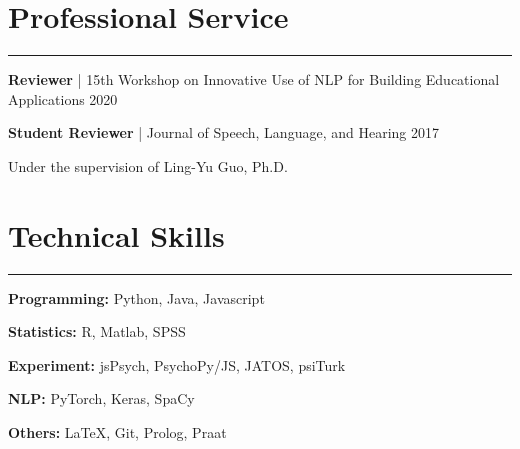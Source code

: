 \documentclass[11pt]{article}
\newcommand{\resumesection}[1]{\vspace{-0.2cm}\section*{#1}\vspace{-0.2cm}\hrule\vspace{0.2cm}}
\begin{document}
\resumesection{Professional Service}

\textbf{Reviewer} | 15th Workshop on Innovative Use of NLP for Building Educational Applications \hfill 2020

\textbf{Student Reviewer} | Journal of Speech, Language, and Hearing \hfill 2017

\quad Under the supervision of Ling-Yu Guo, Ph.D.

\resumesection{Technical Skills}

\textbf{Programming:} Python, Java, Javascript

\textbf{Statistics:} R, Matlab, SPSS

\textbf{Experiment:} jsPsych, PsychoPy/JS, JATOS, psiTurk

\textbf{NLP:} PyTorch, Keras, SpaCy

\textbf{Others:} \LaTeX, Git, Prolog, Praat




\end{document}
